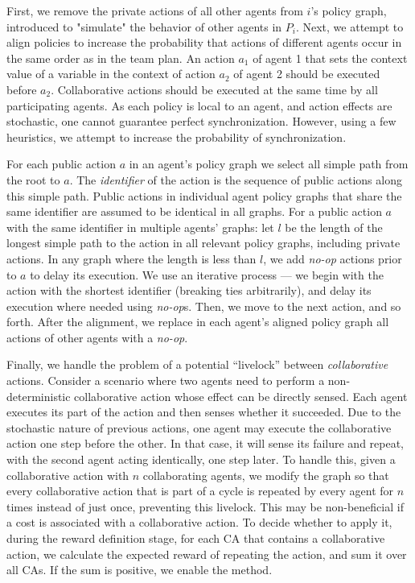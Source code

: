 \documentclass[runningheads]{llncs}
\begin{document}
First, we remove the private actions of all other agents from  $i$'s policy graph,
introduced to "simulate" the behavior of other agents in $P_i$. %
Next, we attempt to align policies to increase the probability that actions of different agents occur in the same order as in the team plan. An action $a_1$ of agent 1 that sets the context value of a variable in the context of action $a_2$ of agent 2 should be executed before $a_2$. Collaborative actions should be executed at the same time by all participating agents.
As each policy is local to an agent, and action effects are stochastic, one cannot guarantee perfect synchronization. However, using a few heuristics, we attempt to increase the probability of synchronization.

For each public action $a$ in an agent's policy graph we select all simple path from the root to $a$. The {\em identifier} of the action is the sequence of public actions along this simple path. Public actions in individual agent policy graphs that share the same identifier are assumed to be identical in all graphs.
For a public action $a$ with the
same identifier in multiple agents' graphs: let $l$ be the length of the longest simple path to the action in all relevant policy graphs, including private actions. In any graph where the length is less than $l$, we add {\em no-op} actions prior to $a$ to delay its execution.
We use an iterative process --- we begin with the action with the shortest identifier (breaking ties arbitrarily), and delay its execution where needed using {\em no-op}s. Then, we move to the next action, and so forth.
After the alignment, we replace in each agent's aligned policy graph all 
actions of other agents with a {\em no-op}.

Finally, we handle the problem of a potential ``livelock'' between \emph{collaborative} actions. Consider a scenario where two agents need to perform a non-deterministic collaborative action whose effect can be directly sensed.
Each agent executes its part of the action and then senses whether it succeeded. 
%
Due to the stochastic nature of previous actions, one agent may execute the
collaborative action one step before the other. In that case, it will sense its failure and repeat, with the second agent acting identically, one step later.
To handle this, given a collaborative action with $n$ collaborating agents, we modify the graph so that every collaborative action that is part of a cycle is repeated by every agent for $n$ times instead of just once, preventing
this livelock. 
This may be non-beneficial if a cost is associated with a collaborative action.
To decide whether to apply it, during the reward definition stage, for each CA that contains a collaborative action, we calculate the expected reward of repeating the action, and sum it over all CAs. If the sum is positive, we enable the method.
\end{document}
